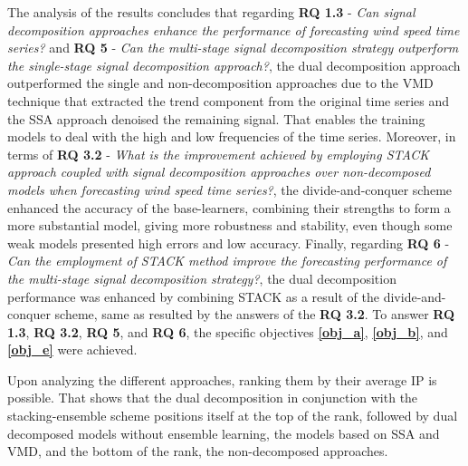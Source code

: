 The analysis of the results concludes that regarding \textbf{RQ 1.3} - \textit{Can signal decomposition approaches enhance the performance of forecasting wind speed time series?} and \textbf{RQ 5} - \textit{Can the multi-stage signal decomposition strategy outperform the single-stage signal decomposition approach?}, the dual decomposition approach outperformed the single and non-decomposition approaches due to the \ac{VMD} technique that extracted the trend component from the original time series and the \ac{SSA} approach denoised the remaining signal. That enables the training models to deal with the high and low frequencies of the time series. Moreover, in terms of \textbf{RQ 3.2} - \textit{What is the improvement achieved by employing \ac{STACK} approach coupled with signal decomposition approaches over non-decomposed models when forecasting wind speed time series?}, the divide-and-conquer scheme enhanced the accuracy of the base-learners, combining their strengths to form a more substantial model, giving more robustness and stability, even though some weak models presented high errors and low accuracy. Finally, regarding \textbf{RQ 6} - \textit{Can the employment of \ac{STACK} method improve the forecasting performance of the multi-stage signal decomposition strategy?}, the dual decomposition performance was enhanced by combining \ac{STACK} as a result of the divide-and-conquer scheme, same as resulted by the answers of the \textbf{RQ 3.2}. To answer \textbf{RQ 1.3}, \textbf{RQ 3.2}, \textbf{RQ 5}, and \textbf{RQ 6}, the specific objectives \textbf{\ref{obj_a}}, \textbf{\ref{obj_b}}, and \textbf{\ref{obj_e}} were achieved.

Upon analyzing the different approaches, ranking them by their average \ac{IP} is possible. That shows that the dual decomposition in conjunction with the stacking-ensemble scheme positions itself at the top of the rank, followed by dual decomposed models without ensemble learning, the models based on \ac{SSA} and \ac{VMD}, and the bottom of the rank, the non-decomposed approaches.
